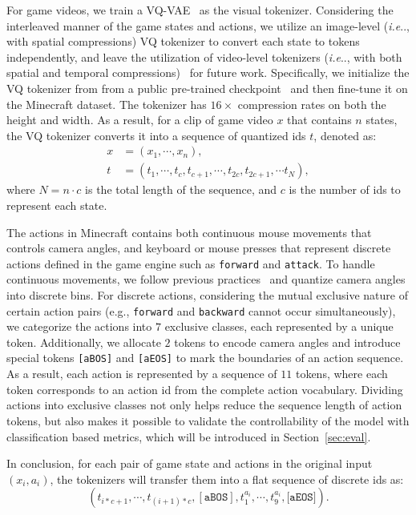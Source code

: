 \documentclass{article} %
\makeatletter
\DeclareRobustCommand\onedot{\futurelet\@let@token\@onedot}
\def\@onedot{\ifx\@let@token.\else.\null\fi\xspace}
\def\ie{\emph{i.e}\onedot} \def\Ie{\emph{I.e}\onedot}
\makeatother
\begin{document}
For game videos, we train a VQ-VAE~\citep{van2017neural,esser2021taming} as the visual tokenizer. Considering the interleaved manner of the game states and actions, we utilize an image-level (\ie, with spatial compressions) VQ tokenizer to convert each state to tokens independently, and leave the utilization of video-level tokenizers (\ie, with both spatial and temporal compressions)~\citep{tang2024vidtok} for future work. Specifically, we initialize the VQ tokenizer from from a public pre-trained checkpoint~\citep{patil2024amused} and then fine-tune it on the Minecraft dataset. The tokenizer has $16\times$ compression rates on both the height and width. As a result, for a clip of game video $x$ that contains $n$ states, the VQ tokenizer converts it into a sequence of quantized ids $t$, denoted as:
\begin{equation} 
\begin{aligned}
x &= (x_1, \cdots,x_n), \\
t &= (t_1, \cdots, t_{c}, t_{c+1}, \cdots, t_{2c}, t_{2c+1}, \cdots t_N),
\end{aligned}
\end{equation}
where $N=n \cdot c$ is the total length of the sequence, and $c$ is the number of ids to represent each state. 

The actions in Minecraft contains both continuous mouse movements that controls camera angles, and keyboard or mouse presses that represent discrete actions defined in the game engine such as \texttt{forward} and \texttt{attack}. To handle continuous movements, we follow previous practices~\citep{baker2022video} and quantize camera angles into discrete bins. For discrete actions, considering the mutual exclusive nature of certain action pairs (e.g., \texttt{forward} and \texttt{backward} cannot occur simultaneously), we categorize the actions into $7$ exclusive classes, each represented by a unique token. Additionally, we allocate $2$ tokens to encode camera angles and introduce special tokens \texttt{[aBOS]} and \texttt{[aEOS]} to mark the boundaries of an action sequence. As a result, each action is represented by a sequence of $11$ tokens, where each token corresponds to an action id from the complete action vocabulary. 
Dividing actions into exclusive classes not only helps reduce the sequence length of action tokens, but also makes it possible to validate the controllability of the model with classification based metrics, which will be introduced in Section~\ref{sec:eval}.

In conclusion, for each pair of game state and actions in the original input $(x_i, a_i)$, the tokenizers will transfer them into a flat sequence of discrete ids as:
\begin{equation}
    (t_{i*c+1}, \cdots, t_{(i+1)*c}, [\texttt{aBOS}], t^{a_i}_1, \cdots, t^{a_i}_9, \texttt{[aEOS]}).
\end{equation}
\end{document}

